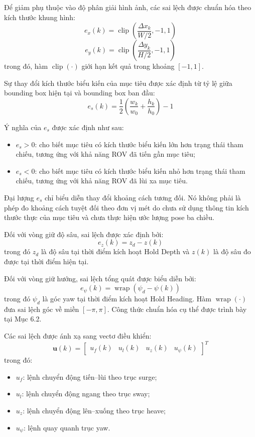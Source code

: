 \documentclass[../DoAn.tex]{subfiles}
\begin{document}
Để giảm phụ thuộc vào độ phân giải hình ảnh, các sai lệch được chuẩn hóa theo kích thước khung hình:
\[
e_x(k) = \operatorname{clip} \left( \frac{\Delta x_k}{W/2}, -1, 1 \right)
\]
\[
e_y(k) = \operatorname{clip} \left( \frac{\Delta y_k}{H/2}, -1, 1 \right)
\]
trong đó, hàm $\operatorname{clip}(\cdot)$ giới hạn kết quả trong khoảng $[-1, 1]$.

Sự thay đổi kích thước biểu kiến của mục tiêu được xác định từ tỷ lệ giữa bounding box hiện tại và bounding box ban đầu:
\[
e_s(k) = \frac{1}{2} \left( \frac{w_k}{w_0} + \frac{h_k}{h_0} \right) - 1
\]

Ý nghĩa của $e_s$ được xác định như sau:
\begin{itemize}
    \item $e_s > 0$: cho biết mục tiêu có kích thước biểu kiến lớn hơn trạng thái tham chiếu, tương ứng với khả năng ROV đã tiến gần mục tiêu;
    \item $e_s < 0$: cho biết mục tiêu có kích thước biểu kiến nhỏ hơn trạng thái tham chiếu, tương ứng với khả năng ROV đã lùi xa mục tiêu.
\end{itemize}

Đại lượng $e_s$ chỉ biểu diễn thay đổi khoảng cách tương đối. Nó không phải là phép đo khoảng cách tuyệt đối theo đơn vị mét do chưa sử dụng thông tin kích thước thực của mục tiêu và chưa thực hiện ước lượng pose ba chiều.

Đối với vòng giữ độ sâu, sai lệch được xác định bởi:
\[
e_z(k) = z_d - z(k)
\]
trong đó $z_d$ là độ sâu tại thời điểm kích hoạt Hold Depth và $z(k)$ là độ sâu đo được tại thời điểm hiện tại.

Đối với vòng giữ hướng, sai lệch tổng quát được biểu diễn bởi:
\[
e_\psi(k) = \operatorname{wrap} \left( \psi_d - \psi(k) \right)
\]
trong đó $\psi_d$ là góc yaw tại thời điểm kích hoạt Hold Heading. Hàm $\operatorname{wrap}(\cdot)$ đưa sai lệch góc về miền $[-\pi, \pi]$. Công thức chuẩn hóa cụ thể được trình bày tại Mục 6.2.

Các sai lệch được ánh xạ sang vectơ điều khiển:
\[
\mathbf{u}(k) = 
\begin{bmatrix}
u_f(k) & u_l(k) & u_z(k) & u_\psi(k)
\end{bmatrix}^{T}
\]
trong đó:
\begin{itemize}
    \item $u_f$: lệnh chuyển động tiến--lùi theo trục surge;
    \item $u_l$: lệnh chuyển động ngang theo trục sway;
    \item $u_z$: lệnh chuyển động lên--xuống theo trục heave;
    \item $u_\psi$: lệnh quay quanh trục yaw.
\end{itemize}
\end{document}
